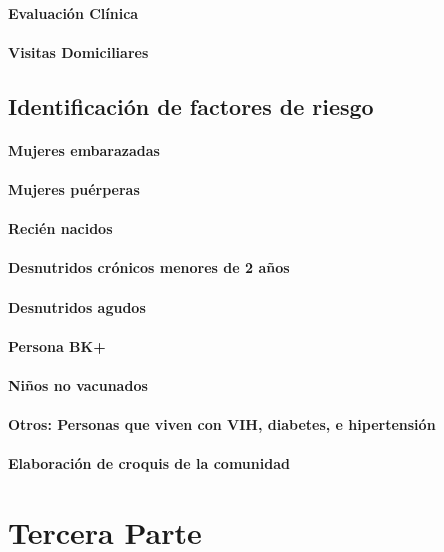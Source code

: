 \documentclass{article}
\begin{document}
\paragraph{Evaluación Clínica}
\paragraph{Visitas Domiciliares}
\subsection{Identificación de factores de riesgo}
\paragraph{Mujeres embarazadas}
\paragraph{Mujeres puérperas}
\paragraph{Recién nacidos}
\paragraph{Desnutridos crónicos menores de 2 años}
\paragraph{Desnutridos agudos}
\paragraph{Persona BK+}
\paragraph{Niños no vacunados}
\paragraph{Otros: Personas que viven con VIH, diabetes, e hipertensión}
\paragraph{Elaboración de croquis de la comunidad}

\section{Tercera Parte}
\end{document}
